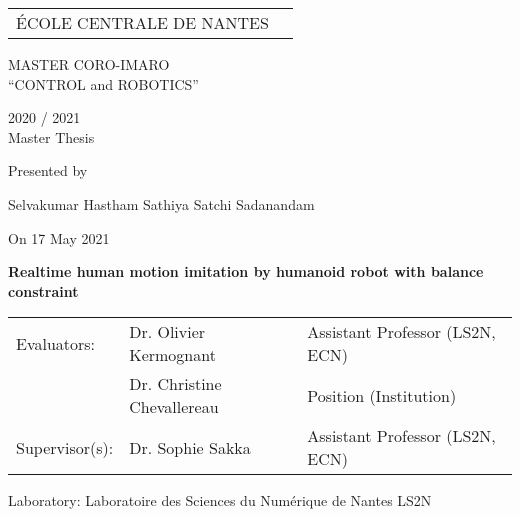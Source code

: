 \thispagestyle{empty}

\def\lskip{\vspace{0.5cm}}


\begin{tabular}{p{7cm}p{8cm}}
ÉCOLE CENTRALE DE NANTES
&
\end{tabular}

\vspace{2cm}

\begin{center} \large\sc MASTER CORO-IMARO\\ \normalsize{``CONTROL and ROBOTICS''} \end{center}



\begin{center}
	2020 / 2021\\
	\lskip
	Master Thesis %
	\lskip
	
	Presented by \lskip 
	
	Selvakumar Hastham Sathiya Satchi Sadanandam \lskip
	
	On 17 May 2021 \lskip\lskip
	
	{\Large \textbf{Realtime human motion imitation by humanoid robot with balance constraint}}
	
	\vfill

		
	\end{center}
	


\begin{tabular}{p{3cm}p{5cm}p{7cm} }
 Evaluators: & Dr. Olivier Kermognant & Assistant Professor (LS2N, ECN) \\
	      & Dr. Christine Chevallereau & Position (Institution) \\ 
  Supervisor(s):  & Dr. Sophie Sakka & Assistant Professor (LS2N, ECN) \\
\end{tabular}

\lskip

\begin{flushleft}
 Laboratory: Laboratoire des Sciences du Numérique de Nantes LS2N
\end{flushleft}

\newpage
\thispagestyle{empty}
\null
\newpage
\addtocounter{page}{-1}
\pagestyle{fancy}
